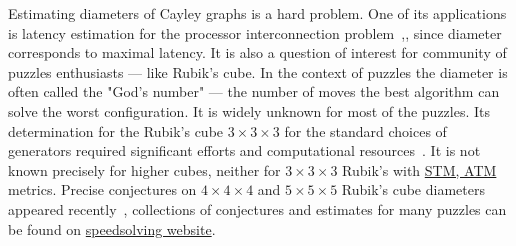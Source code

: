 \documentclass[reqno,11pt]{amsart}
\begin{document}






Estimating diameters of Cayley graphs is a hard problem. One of its applications is latency estimation for the processor interconnection problem~\cite{akers1989group},\cite{cooperman1991applications}, \cite{heydemann1997cayley} since diameter corresponds to maximal latency. 
It is also a question of interest for community of puzzles enthusiasts --- like Rubik's cube. In the context of puzzles the diameter is often called the "God's number" --- the number of moves the best algorithm can solve the worst configuration. It is widely unknown for most of the puzzles. Its determination for the Rubik's cube $3\times 3 \times3$  for the standard choices of generators required significant efforts and computational resources~\cite{Rokicki2014Diameter}.  It is not known precisely for higher cubes, neither for $3\times 3 \times3$ Rubik's with \href{https://www.speedsolving.com/wiki/index.php?title=Metric#STM}{STM, ATM} metrics.
Precise conjectures on $4\times 4 \times4$  and $5\times 5 \times5$ Rubik's cube diameters appeared recently~\cite{hirata2024probabilistic}, collections of conjectures and estimates for many puzzles can be found on \href{https://www.speedsolving.com/wiki/index.php?title=God%27s_Algorithm#Table_of_God.27s_Numbers}{speedsolving website}. 
\end{document}
